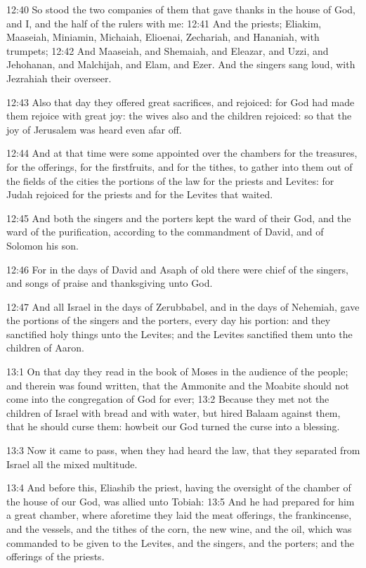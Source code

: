 12:40 So stood the two companies of them that gave thanks in the house of God, and I, and the half of the rulers with me: 12:41 And the priests; Eliakim, Maaseiah, Miniamin, Michaiah, Elioenai, Zechariah, and Hananiah, with trumpets; 12:42 And Maaseiah, and Shemaiah, and Eleazar, and Uzzi, and Jehohanan, and Malchijah, and Elam, and Ezer.  And the singers sang loud, with Jezrahiah their overseer.

12:43 Also that day they offered great sacrifices, and rejoiced: for God had made them rejoice with great joy: the wives also and the children rejoiced: so that the joy of Jerusalem was heard even afar off.

12:44 And at that time were some appointed over the chambers for the treasures, for the offerings, for the firstfruits, and for the tithes, to gather into them out of the fields of the cities the portions of the law for the priests and Levites: for Judah rejoiced for the priests and for the Levites that waited.

12:45 And both the singers and the porters kept the ward of their God, and the ward of the purification, according to the commandment of David, and of Solomon his son.

12:46 For in the days of David and Asaph of old there were chief of the singers, and songs of praise and thanksgiving unto God.

12:47 And all Israel in the days of Zerubbabel, and in the days of Nehemiah, gave the portions of the singers and the porters, every day his portion: and they sanctified holy things unto the Levites; and the Levites sanctified them unto the children of Aaron.

13:1 On that day they read in the book of Moses in the audience of the people; and therein was found written, that the Ammonite and the Moabite should not come into the congregation of God for ever; 13:2 Because they met not the children of Israel with bread and with water, but hired Balaam against them, that he should curse them: howbeit our God turned the curse into a blessing.

13:3 Now it came to pass, when they had heard the law, that they separated from Israel all the mixed multitude.

13:4 And before this, Eliashib the priest, having the oversight of the chamber of the house of our God, was allied unto Tobiah: 13:5 And he had prepared for him a great chamber, where aforetime they laid the meat offerings, the frankincense, and the vessels, and the tithes of the corn, the new wine, and the oil, which was commanded to be given to the Levites, and the singers, and the porters; and the offerings of the priests.

